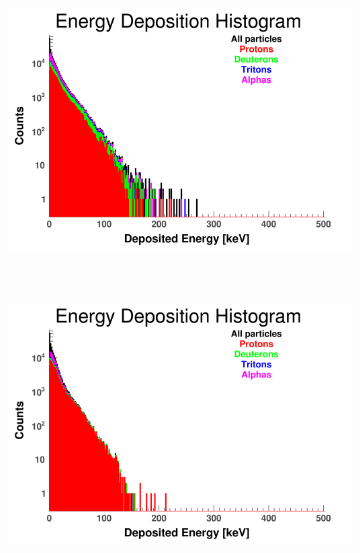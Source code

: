 \documentclass[10pt,a4paper]{report}
\begin{document}
\begin{figure}[htbp]
    \begin{subfigure}[htbp]{0.42\textwidth}
        \label{fig:E3}
        \includegraphics[width=\textwidth]{./E3_QGSP_INCLXX_HP_Edep.png}
    \end{subfigure}
    ~ 
    \begin{subfigure}[htbp]{0.42\textwidth}
        \label{fig:E4}
        \includegraphics[width=\textwidth]{./E4_QGSP_BERT_HP_Edep.png}
    \end{subfigure}
    
    \vspace{1mm}
    

\end{figure}
\end{document}

